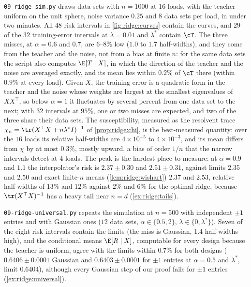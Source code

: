 \begin{refsection}
\texttt{09-ridge-sim.py} draws data sets with $n=1000$ at $16$ loads, with the teacher uniform on the unit sphere, noise variance $0.25$ and $8$ data sets per load, in under two minutes. All $48$ risk intervals in \cref{fig:ridge:curves} contain the curves, and $29$ of the $32$ training-error intervals at $\lambda=0.01$ and $\lambda^*$ contain $\cT$. The three misses, at $\alpha=0.6$ and $0.7$, are $6$--$8\%$ low ($1.0$ to $1.7$ half-widths), and they come from the teacher and the noise, not from a bias at finite $n$: for the same data sets the script also computes $\E[T\mid X]$, in which the direction of the teacher and the noise are averaged exactly, and its mean lies within $0.2\%$ of $\cT$ there (within $0.9\%$ at every load). Given $X$, the training error is a quadratic form in the teacher and the noise whose weights are largest at the smallest eigenvalues of $XX^\top$, so below $\alpha=1$ it fluctuates by several percent from one data set to the next; with $32$ intervals at $95\%$, one or two misses are expected, and two of the three share their data sets. The susceptibility, measured as the resolvent trace $\chi_n=\tr(X^\top X+n\lambda^*I)^{-1}$ of \cref{prop:ridge:chi}, is the best-measured quantity: over the $16$ loads its relative half-widths are $4\times10^{-5}$ to $4\times10^{-3}$, and its mean differs from $\chi$ by at most $0.3\%$, mostly upward, a bias of order $1/n$ that the narrow intervals detect at $4$ loads. The peak is the hardest place to measure: at $\alpha=0.9$ and $1.1$ the interpolator's risk is $2.37\pm0.30$ and $2.51\pm0.31$, against limits $2.35$ and $2.50$ and exact finite-$n$ means (\cref{lem:ridge:wishart}) $2.37$ and $2.53$, relative half-widths of $13\%$ and $12\%$ against $2\%$ and $6\%$ for the optimal ridge, because $\tr(X^\top X)^{-1}$ has a heavy tail near $n=d$ (\cref{ex:ridge:tails}).

\texttt{09-ridge-universal.py} repeats the simulation at $n=500$ with independent $\pm1$ entries and with Gaussian ones ($12$ data sets, $\alpha\in\{0.5,2\}$, $\lambda\in\{0,\lambda^*\}$). Seven of the eight risk intervals contain the limits (the miss is Gaussian, $1.4$ half-widths high), and the conditional means $\E[R\mid X]$, computable for every design because the teacher is uniform, agree with the limits within $0.7\%$ for both designs ($0.6406\pm0.0001$ Gaussian and $0.6403\pm0.0001$ for $\pm1$ entries at $\alpha=0.5$ and $\lambda^*$, limit $0.6404$), although every Gaussian step of our proof fails for $\pm1$ entries (\cref{ex:ridge:universal}).


\end{refsection}
